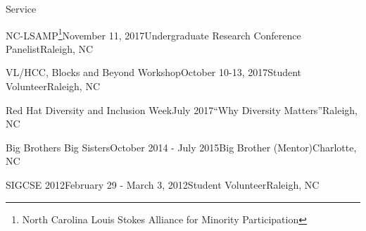 \documentclass{resume} %
\begin{document}
\begin{rSection}{Service}
\begin{sSubsection}{NC-LSAMP\footnote{North Carolina Louis Stokes Alliance for Minority Participation}}{November 11, 2017}{Undergraduate Research Conference Panelist}{Raleigh, NC}
\end{sSubsection}
\vspace{-5pt}
\begin{sSubsection}{VL/HCC, Blocks and Beyond Workshop}{October 10-13, 2017}{Student Volunteer}{Raleigh, NC}
\end{sSubsection}
\vspace{-5pt}
\begin{sSubsection}{Red Hat Diversity and Inclusion Week}{July 2017}{``Why Diversity Matters''}{Raleigh, NC}
\end{sSubsection}
\vspace{-5pt}

\begin{sSubsection}{Big Brothers Big Sisters}{October 2014 - July 2015}{Big Brother (Mentor)}{Charlotte, NC}
\end{sSubsection}
\vspace{-5pt}
\begin{sSubsection}{SIGCSE 2012}{February 29 - March 3, 2012}{Student Volunteer}{Raleigh, NC}
\end{sSubsection}
\end{rSection}


\end{document}
